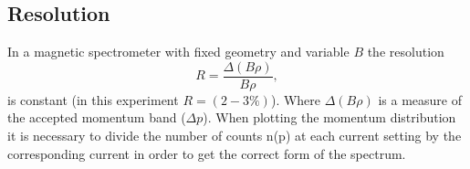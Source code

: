 \documentclass[10pt, a4paper]{article}
\begin{document}
\begin{multicols}{2}





\subsection{Resolution}
In a magnetic spectrometer with fixed geometry and variable $B$ the resolution 
\begin{equation}R = \frac{\Delta(B \rho)}{B \rho},
\end{equation}
is constant (in this experiment $R = (2-3\%)$). 
Where $\Delta(B \rho)$ is a measure of the accepted momentum band ($\Delta p$). 
When plotting the momentum distribution it is necessary to divide the number of counts n(p) at each current setting by the corresponding current in order to get the correct form of the spectrum\cite{Siegbahn}.



\end{multicols}
\end{document}
